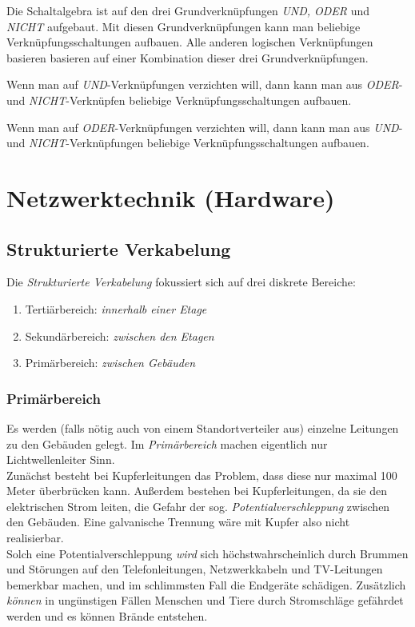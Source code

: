 \documentclass[a4paper, 12pt]{report}
\begin{document}
\begin{multicols}{2}
Die Schaltalgebra ist auf den drei Grundverknüpfungen \emph{UND, ODER} und
\emph{NICHT} aufgebaut. Mit diesen Grundverknüpfungen kann man beliebige
Verknüpfungsschaltungen aufbauen. Alle anderen logischen Verknüpfungen basieren
basieren auf einer Kombination dieser drei Grundverknüpfungen.

Wenn man auf \emph{UND}-Verknüpfungen verzichten will, dann kann man aus
\emph{ODER}- und \emph{NICHT}-Verknüpfen beliebige Verknüpfungsschaltungen
aufbauen.

Wenn man auf \emph{ODER}-Verknüpfungen verzichten will, dann kann man aus
\emph{UND}- und \emph{NICHT}-Verknüpfungen beliebige Verknüpfungsschaltungen
aufbauen.


\section{Netzwerktechnik (Hardware)}
\subsection{Strukturierte Verkabelung}

Die \emph{Strukturierte Verkabelung} fokussiert sich auf drei diskrete Bereiche:
\begin{enumerate}
    \item Tertiärbereich: \emph{innerhalb einer Etage}
    \item Sekundärbereich: \emph{zwischen den Etagen}
    \item Primärbereich: \emph{zwischen Gebäuden}
\end{enumerate}

\subsubsection{Primärbereich}
Es werden (falls nötig auch von einem Standortverteiler aus) einzelne Leitungen
zu den Gebäuden gelegt. Im \emph{Primärbereich} machen eigentlich nur
Lichtwellenleiter Sinn. \\

Zunächst besteht bei Kupferleitungen das Problem, dass diese nur maximal 100
Meter überbrücken kann. Außerdem bestehen bei Kupferleitungen, da sie den
elektrischen Strom leiten, die Gefahr der sog. \emph{Potentialverschleppung}
zwischen den Gebäuden. Eine galvanische Trennung wäre mit Kupfer also nicht
realisierbar. \\

Solch eine Potentialverschleppung \emph{wird} sich höchstwahrscheinlich durch
Brummen und Störungen auf den Telefonleitungen, Netzwerkkabeln und TV-Leitungen
bemerkbar machen, und im schlimmsten Fall die Endgeräte schädigen. Zusätzlich
\emph{können} in ungünstigen Fällen Menschen und Tiere durch Stromschläge
gefährdet werden und es können Brände entstehen. \\


\end{multicols}
\end{document}
